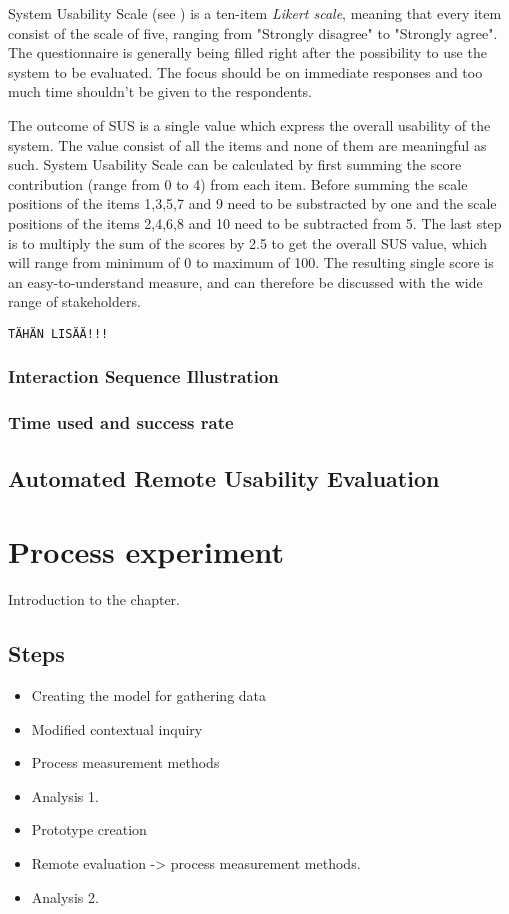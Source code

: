 \documentclass[12pt,a4paper,oneside,pdftex]{report}
\begin{document}
	System Usability Scale (see ) is a ten-item \emph{Likert scale}, meaning that every item consist of the scale of five, ranging from "Strongly disagree" to "Strongly agree". The questionnaire is generally being filled right after the possibility to use 		the system to be evaluated. The focus should be on immediate responses and too much time shouldn't be given to the respondents. \cite{RefWorks:10} 

	The outcome of SUS is a single value which express the overall usability of the system. The value consist of all the items and none of them are meaningful as such. System Usability Scale can be calculated by first summing the score contribution (range from 0 to 4) 			from each item. Before summing the scale positions of the items 1,3,5,7 and 9 need to be substracted by one and the scale positions of the items 2,4,6,8 and 10 need to be subtracted from 5. The last step is to multiply the sum of the scores by 2.5 to get the overall 			SUS value, which will range from minimum of 0 to maximum of 100. \cite{RefWorks:10} The resulting single score is an easy-to-understand measure, and can therefore be discussed with the wide range of stakeholders. \cite{RefWorks:12} 

	\texttt{TÄHÄN LISÄÄ!!!}
        \subsection{Interaction Sequence Illustration}
        \subsection{Time used and success rate}

\section{Automated Remote Usability Evaluation}
\label{sec:rue}
 
    

    
\chapter{Process experiment}
\label{processexperiment}
Introduction to the chapter.

    \section{Steps}
    \label{sec:steps}
        \begin{itemize}
            \item Creating the model for gathering data
            \item Modified contextual inquiry 
            \item Process measurement methods
            \item Analysis 1.
            \item Prototype creation
            \item Remote evaluation -> process measurement methods.
            \item Analysis 2.
        \end{itemize}
\end{document}
